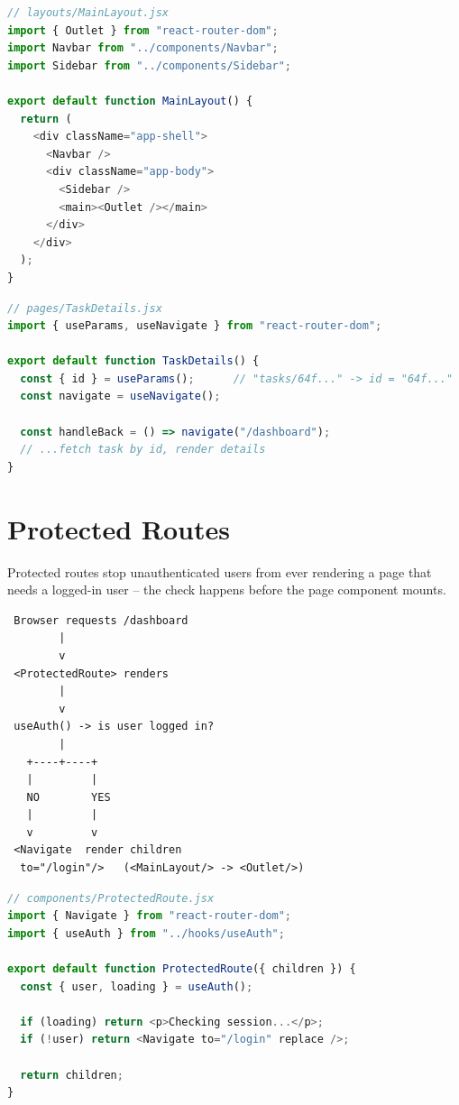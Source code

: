 \begin{lstlisting}[language=JavaScript]
// layouts/MainLayout.jsx
import { Outlet } from "react-router-dom";
import Navbar from "../components/Navbar";
import Sidebar from "../components/Sidebar";

export default function MainLayout() {
  return (
    <div className="app-shell">
      <Navbar />
      <div className="app-body">
        <Sidebar />
        <main><Outlet /></main>
      </div>
    </div>
  );
}
\end{lstlisting}

\begin{lstlisting}[language=JavaScript]
// pages/TaskDetails.jsx
import { useParams, useNavigate } from "react-router-dom";

export default function TaskDetails() {
  const { id } = useParams();      // "tasks/64f..." -> id = "64f..."
  const navigate = useNavigate();

  const handleBack = () => navigate("/dashboard");
  // ...fetch task by id, render details
}
\end{lstlisting}

\section{Protected Routes}

Protected routes stop unauthenticated users from ever rendering a page that
needs a logged-in user -- the check happens before the page component mounts.

\begin{diagrambox}
\begin{verbatim}
 Browser requests /dashboard
        |
        v
 <ProtectedRoute> renders
        |
        v
 useAuth() -> is user logged in?
        |
   +----+----+
   |         |
   NO        YES
   |         |
   v         v
 <Navigate  render children
  to="/login"/>   (<MainLayout/> -> <Outlet/>)
\end{verbatim}
\end{diagrambox}

\begin{lstlisting}[language=JavaScript]
// components/ProtectedRoute.jsx
import { Navigate } from "react-router-dom";
import { useAuth } from "../hooks/useAuth";

export default function ProtectedRoute({ children }) {
  const { user, loading } = useAuth();

  if (loading) return <p>Checking session...</p>;
  if (!user) return <Navigate to="/login" replace />;

  return children;
}
\end{lstlisting}

